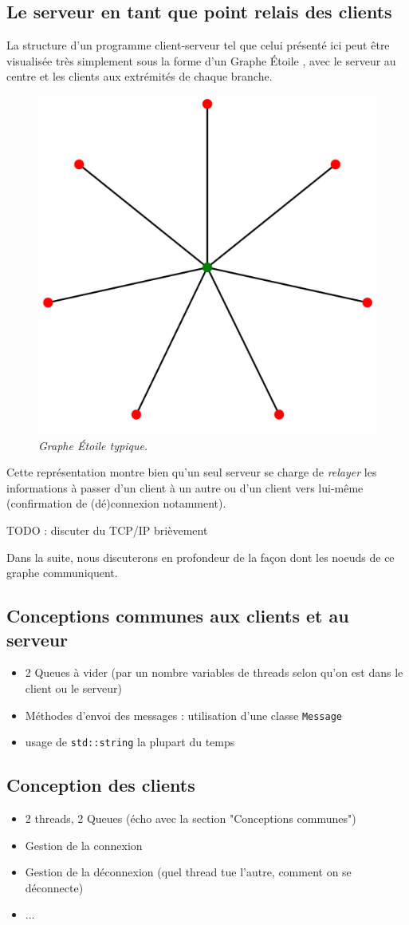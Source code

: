 \documentclass{article}
\begin{document}
\subsection{Le serveur en tant que point relais des clients}
La structure d'un programme client-serveur tel que celui présenté ici peut être visualisée très simplement sous la forme d'un Graphe Étoile \cite{Graphe Étoile}, avec le serveur au centre et les clients aux extrémités de chaque branche. 
\begin{figure}[ht]
    \centering
    \includegraphics[width=0.25\linewidth]{etoile.png}
    \caption{\textit{Graphe Étoile typique.}}
\end{figure}

Cette représentation montre bien qu'un seul serveur se charge de \textit{relayer} les informations à passer d'un client à un autre ou d'un client vers lui-même (confirmation de (dé)connexion notamment). 

TODO : discuter du TCP/IP brièvement

Dans la suite, nous discuterons en profondeur de la façon dont les noeuds de ce graphe communiquent.

\subsection{Conceptions communes aux clients et au serveur}
\begin{itemize}
    \item 2 Queues à vider (par un nombre variables de threads selon qu'on est dans le client ou le serveur)
    \item Méthodes d'envoi des messages : utilisation d'une classe \texttt{Message}
    \item usage de \texttt{std::string} la plupart du temps
\end{itemize}

\subsection{Conception des clients}
\begin{itemize}
    \item 2 threads, 2 Queues (écho avec la section "Conceptions communes")
    \item Gestion de la connexion
    \item Gestion de la déconnexion (quel thread tue l'autre, comment on se déconnecte)
    \item ...
    
\end{itemize}
\end{document}
